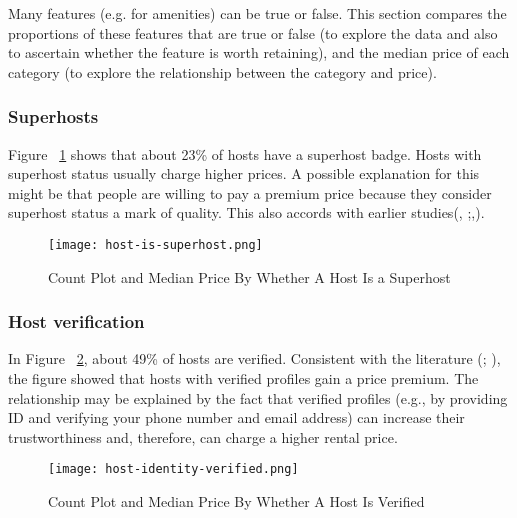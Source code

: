 Many features (e.g. for amenities) can be true or false. This section compares
the proportions of these features that are true or false (to explore the data
and also to ascertain whether the feature is worth retaining), and the median
price of each category (to explore the relationship between the category and
price).

\subsubsection*{Superhosts}

Figure ~\ref{fig:host_is_superhost} shows that about 23\% of hosts have a
superhost badge. Hosts with superhost status usually charge higher prices. A
possible explanation for this might be that people are willing to pay a premium
price because they consider superhost status a mark of quality.  This also
accords with earlier studies(\cite{gibbs2018use},
\cite{kakar2016effects};\cite{wang2017price},\cite{cai2019price}).

\begin{figure}[H]\centering
    \texttt{[image: host-is-superhost.png]}
    \caption{Count Plot and Median Price By Whether A Host Is a Superhost}
    \label{fig:host_is_superhost}
\end{figure}

\subsubsection*{Host verification}
In Figure ~\ref{fig:host_identity_verified}, about 49\% of hosts are verified.
Consistent with the literature (\cite{chen2017consumer}; \cite{wang2017price}),
the figure showed that hosts with verified profiles gain a price premium. The
relationship may be explained by the fact that verified profiles (e.g., by
providing ID and verifying your phone number and email address)  can increase
their trustworthiness and, therefore, can charge a higher rental price.

\begin{figure}[H]\centering
    \texttt{[image: host-identity-verified.png]}
    \caption{Count Plot and Median Price By Whether A Host Is Verified}
    \label{fig:host_identity_verified}
\end{figure}


